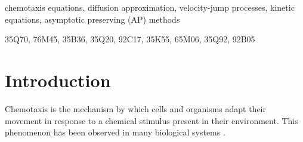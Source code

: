 \documentclass[review,onefignum,onetabnum]{siamart220329}
\begin{document}
\maketitle

\begin{abstract}
In this work we first prove, by formal arguments, that the diffusion limit of nonlinear kinetic equations, where both the \textit{transport term and the turning operator are density-dependent}, leads to volume-exclusion chemotactic equations. We generalise an asymptotic preserving scheme for such nonlinear kinetic equations based on a micro-macro decomposition. By properly discretizing the nonlinear term implicitly-explicitly in an upwind manner, the scheme produces accurate approximations also in the case of strong chemosensitivity. We show, via detailed calculations, that the scheme is asymptotic preserving and {{bound preserving}} and show numerically an {energy dissipation} property, which are essential for practical applications. We extend this scheme to two dimensional kinetic models and we  validate its efficiency by means of 1D and 2D numerical experiments of pattern formation in biological systems.
\end{abstract}

\begin{keywords}
chemotaxis equations, diffusion approximation, velocity-jump processes,
kinetic equations, asymptotic preserving (AP) methods
\end{keywords}

\begin{MSCcodes}
35Q70, 76M45, 35B36, 35Q20, 92C17, 35K55, 65M06, 35Q92, 92B05
\end{MSCcodes}

\section{Introduction}
Chemotaxis is the mechanism by which cells and organisms adapt their movement in response to a chemical stimulus present in their environment. This phenomenon has been observed in many biological systems \cite{Alt1980,Kaupp2012,Jin2008,Roussos2011}. 
\end{document}
